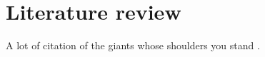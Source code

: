 \section{Literature review}
A lot of citation of the giants whose shoulders you stand \cite{Adams1979}.